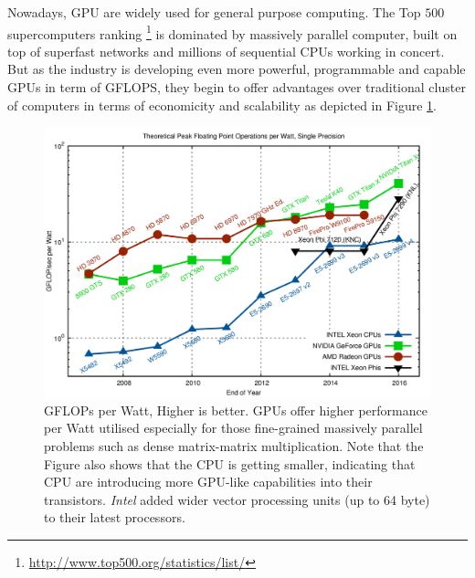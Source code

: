 \begin{description}
\begin{figure}[!htbp]
    \end{figure}
    Nowadays, GPU are widely used for general purpose computing. The Top $500$ supercomputers  ranking \footnote{\url{http://www.top500.org/statistics/list/}}  \cite{Strohmaier:2006:TS:1188455.1188474} is dominated by massively parallel computer, built on top of superfast networks and millions of sequential CPUs working in concert.
    But as the industry is developing even more powerful, programmable and capable GPUs in term of \si{\giga FLOPS}, they begin to offer advantages over traditional cluster of computers in terms of economicity and scalability as depicted in Figure \ref{gflops-per-watt-sp}.
        \begin{figure}[!htbp]
    	\centering
    	\includegraphics[width=1.0\textwidth]{./images/parallel_programming/gflops-per-watt-sp}
    	\caption[GFLOPs per \si{Watt} metric for CPUs and GPUs]{GFLOPs per \si{Watt}, Higher is better. GPUs offer higher performance per Watt utilised especially for those fine-grained massively parallel problems such as dense matrix-matrix multiplication. Note that the Figure also shows that the CPU is getting smaller, indicating that CPU are introducing more GPU-like capabilities into their transistors. \textit{Intel} added wider vector processing units (up to 64 byte) to their latest processors. }
    	\label{gflops-per-watt-sp}
    \end{figure}
  

\end{description}
